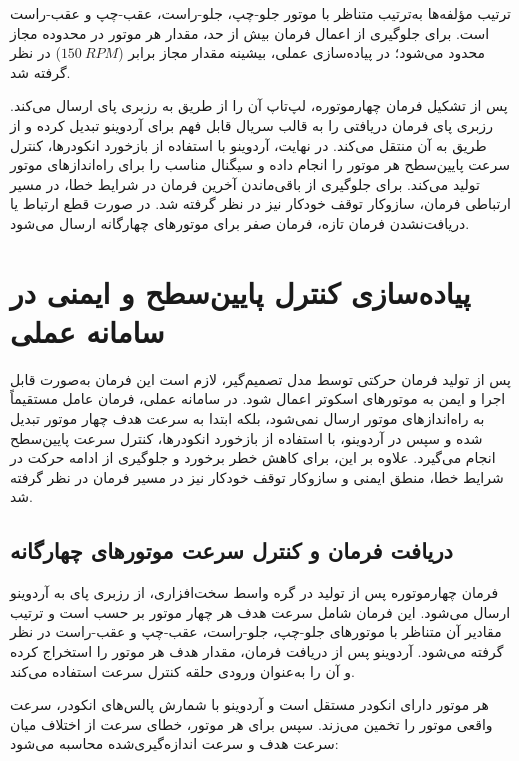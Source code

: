 ترتیب مؤلفه‌ها به‌ترتیب متناظر با موتور جلو-چپ، جلو-راست، عقب-چپ و عقب-راست است. برای جلوگیری از اعمال فرمان بیش از حد، مقدار  هر موتور در محدوده مجاز محدود می‌شود؛ در پیاده‌سازی عملی، بیشینه مقدار مجاز برابر ($150~RPM$) در نظر گرفته شد.

پس از تشکیل فرمان چهارموتوره، لپ‌تاپ آن را از طریق  به رزبری پای ارسال می‌کند. رزبری پای فرمان دریافتی را به قالب سریال قابل فهم برای آردوینو تبدیل کرده و از طریق  به آن منتقل می‌کند. در نهایت، آردوینو با استفاده از بازخورد انکودرها، کنترل سرعت پایین‌سطح هر موتور را انجام داده و سیگنال  مناسب را برای راه‌اندازهای موتور تولید می‌کند. برای جلوگیری از باقی‌ماندن آخرین فرمان در شرایط خطا، در مسیر ارتباطی فرمان، سازوکار توقف خودکار نیز در نظر گرفته شد. در صورت قطع ارتباط یا دریافت‌نشدن فرمان تازه، فرمان صفر برای موتورهای چهارگانه ارسال می‌شود.
\section{پیاده‌سازی کنترل پایین‌سطح و ایمنی در سامانه عملی}
\label{sec:real_low_level_control_and_safety}

پس از تولید فرمان حرکتی توسط مدل تصمیم‌گیر، لازم است این فرمان به‌صورت قابل اجرا و ایمن به موتورهای اسکوتر اعمال شود. در سامانه عملی، فرمان عامل مستقیماً به راه‌اندازهای موتور ارسال نمی‌شود، بلکه ابتدا به سرعت هدف چهار موتور تبدیل شده و سپس در آردوینو، با استفاده از بازخورد انکودرها، کنترل سرعت پایین‌سطح انجام می‌گیرد. علاوه بر این، برای کاهش خطر برخورد و جلوگیری از ادامه حرکت در شرایط خطا، منطق ایمنی و سازوکار توقف خودکار نیز در مسیر فرمان در نظر گرفته شد.

\subsection{دریافت فرمان و کنترل سرعت موتورهای چهارگانه}
\label{subsec:real_motor_speed_control}

فرمان چهارموتوره پس از تولید در گره واسط سخت‌افزاری، از رزبری پای به آردوینو ارسال می‌شود. این فرمان شامل سرعت هدف هر چهار موتور بر حسب  است و ترتیب مقادیر آن متناظر با موتورهای جلو-چپ، جلو-راست، عقب-چپ و عقب-راست در نظر گرفته می‌شود. آردوینو پس از دریافت فرمان، مقدار هدف هر موتور را استخراج کرده و آن را به‌عنوان ورودی حلقه کنترل سرعت استفاده می‌کند.

هر موتور دارای انکودر مستقل است و آردوینو با شمارش پالس‌های انکودر، سرعت واقعی موتور را تخمین می‌زند. سپس برای هر موتور، خطای سرعت از اختلاف میان سرعت هدف و سرعت اندازه‌گیری‌شده محاسبه می‌شود:


